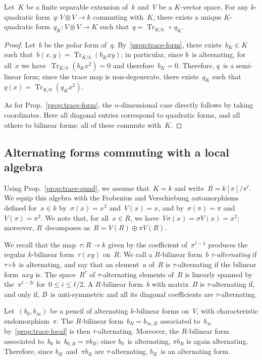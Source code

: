 \documentclass{lms}
\DeclareMathOperator\Tr{Tr}
\begin{document}
\begin{prop} \label{prop:trace-quad}
Let~$K$ be a finite separable extension of~$k$ and~$V$ be a $K$-vector
space. For any $k$-quadratic form~$q: V ⊗ V → k$ commuting with~$K$,
there exists a unique $K$-quadratic form~$q_K: V ⊗ V → K$ such that~$q =
\Tr_{K/k} \, ∘ \, q_K$.
\end{prop}

\begin{proof}
Let~$b$ be the polar form of~$q$. By~\ref{prop:trace-form},
there exists~$b_K ∈ K$
such that~$b(x,y) = \Tr_{K/k} (b_K xy)$; in particular, since $b$~is
alternating, for all~$x$ we have~$\Tr_{K/k} (b_K x^2) = 0$ and
therefore~$b_K = 0$. Therefore, $q$~is a semi-linear form; since the
trace map is non-degenerate, there exists~$q_K$ such that~$q(x) =
\Tr_{K/k} (q_K x^2)$.

As for Prop.~\ref{prop:trace-form}, the $n$-dimensional case directly follows by
taking coordinates. Here all diagonal entries correspond to quadratic
forms, and all others to bilinear forms; all of these commute with~$K$.
\end{proof}

\subsection{Alternating forms commuting with a local algebra}
\label{SS:alt-pencil}

Using Prop.~\ref{prop:trace-quad},
we assume that~$K = k$ and write~$R = k[π] / π^ℓ$.
We equip this algebra with the Frobenius and Verschiebung automorphisms
defined for~$x ∈ k$ by~$σ(x) = x^2$ and~$V(x) = x$,
and by~$σ(π) = π$ and~$V(π) = π^2$.
We note that, for all~$x ∈ R$, we have~$V σ(x) = σ V(x) = x^2$;
moreover, $R$~decomposes as~$R = V(R) ⊕ π V(R)$.

We recall that the map~$τ: R → k$ given by the coefficient of~$π^{ℓ-1}$
produces the regular $k$-bilinear form~$τ(x y)$ on~$R$.
We call a $R$-bilinear form~$b$ \emph{$τ$-alternating} if $τ ∘ b$~is
alternating, and say that an element~$a$ of~$R$ is $τ$-alternating if the
bilinear form~$a x y$ is.
The space~$R^{τ}$ of $τ$-alternating elements of~$R$ is linearly spanned
by the~$π^{ℓ-2i}$ for~$0 ≤ i ≤ ℓ/2$.
A $R$-bilinear form~$b$ with matrix~$B$ is $τ$-alternating if, and only if,
$B$~is anti-symmetric and all its diagonal coefficients are $τ$-alternating.

Let~$(b_0, b_{∞})$ be a pencil of alternating $k$-bilinear forms on~$V$,
with characteristic endomorphism~$π$. The $R$-bilinear form~$b_R = b_{∞,
R}$ associated to~$b_{∞}$ by~\ref{prop:trace-local} is then
$τ$-alternating. Moreover, the $R$-bilinear form associated to~$b_{0}$
is~$b_{0, R} = π b_R$; since $b_{0}$~is alternating, $π b_R$ is again
alternating. Therefore, since $b_R$~and~$π b_R$ are $τ$-alternating,
$b_R$~is an alternating form.
\end{document}
